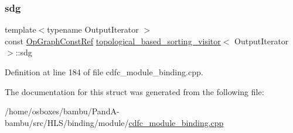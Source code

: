 \mbox{\label{structtopological__based__sorting__visitor_a62c7d05e0ca7b5b1f6d977f6e9384c34}} 
\subsubsection{\texorpdfstring{sdg}{sdg}}
{\footnotesize\ttfamily template$<$typename Output\+Iterator $>$ \\
const \hyperlink{op__graph_8hpp_a9a0b240622c47584bee6951a6f5de746}{Op\+Graph\+Const\+Ref} \hyperlink{structtopological__based__sorting__visitor}{topological\+\_\+based\+\_\+sorting\+\_\+visitor}$<$ Output\+Iterator $>$\+::sdg}



Definition at line 184 of file cdfc\+\_\+module\+\_\+binding.\+cpp.



The documentation for this struct was generated from the following file\+:\begin{DoxyCompactItemize}
\item 
/home/osboxes/bambu/\+Pand\+A-\/bambu/src/\+H\+L\+S/binding/module/\hyperlink{cdfc__module__binding_8cpp}{cdfc\+\_\+module\+\_\+binding.\+cpp}\end{DoxyCompactItemize}
